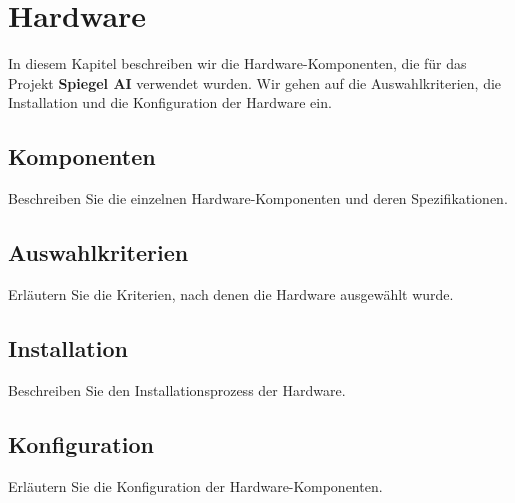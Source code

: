 \chapter{Hardware}

In diesem Kapitel beschreiben wir die Hardware-Komponenten, die für das Projekt \textbf{Spiegel AI} verwendet wurden. Wir gehen auf die Auswahlkriterien, die Installation und die Konfiguration der Hardware ein.

\section{Komponenten}
Beschreiben Sie die einzelnen Hardware-Komponenten und deren Spezifikationen.

\section{Auswahlkriterien}
Erläutern Sie die Kriterien, nach denen die Hardware ausgewählt wurde.

\section{Installation}
Beschreiben Sie den Installationsprozess der Hardware.

\section{Konfiguration}
Erläutern Sie die Konfiguration der Hardware-Komponenten.
